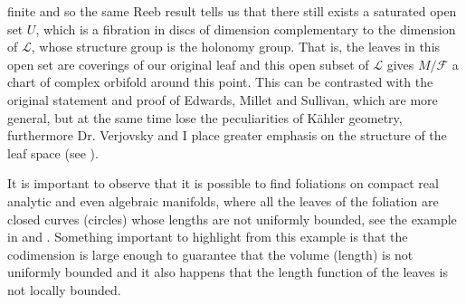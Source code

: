 \documentclass{article}
\begin{document}
finite and so the same Reeb result tells us that there still exists a saturated open set $U$, which is a fibration in
discs of dimension complementary to the dimension of $\mathcal{L}$, whose structure group is the holonomy group.
That is, the leaves in this open set are coverings of our original leaf and this open subset of $\mathcal{L}$ gives $M/\mathcal{F}$
a chart of complex orbifold around this point.
This can be contrasted with the original statement and proof of Edwards, Millet and Sullivan, which are more general, but at the same time lose
the peculiarities of Kähler geometry, furthermore Dr. Verjovsky and I place greater emphasis on the structure of the
leaf space (see \cite{EMS}).

It is important to observe that it is possible to find foliations on compact real analytic and even algebraic manifolds, where
all the leaves of the foliation are closed curves (circles) whose lengths are not uniformly bounded, see the example in \cite{E-V} and \cite{Epstein2}.
Something important to highlight from this example is that the codimension is large enough
to guarantee that the volume (length) is not uniformly bounded and it also happens that the length function of the leaves
is not locally bounded.
\end{document}
